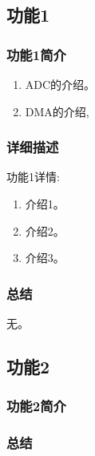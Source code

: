 \subsection{功能1}
\subsubsection{功能1简介}
\begin{enumerate}
    \item ADC的介绍。  
    \item DMA的介绍,
\end{enumerate}\par
\par
\subsubsection{详细描述}
功能1详情:
\begin{enumerate}
    \item 介绍1。
    \item 介绍2。
    \item 介绍3。
\end{enumerate}
\par
\subsubsection{总结}
无。\par

\clearpage
\subsection{功能2}
\subsubsection{功能2简介}

\par
\subsubsection{总结}

\par


